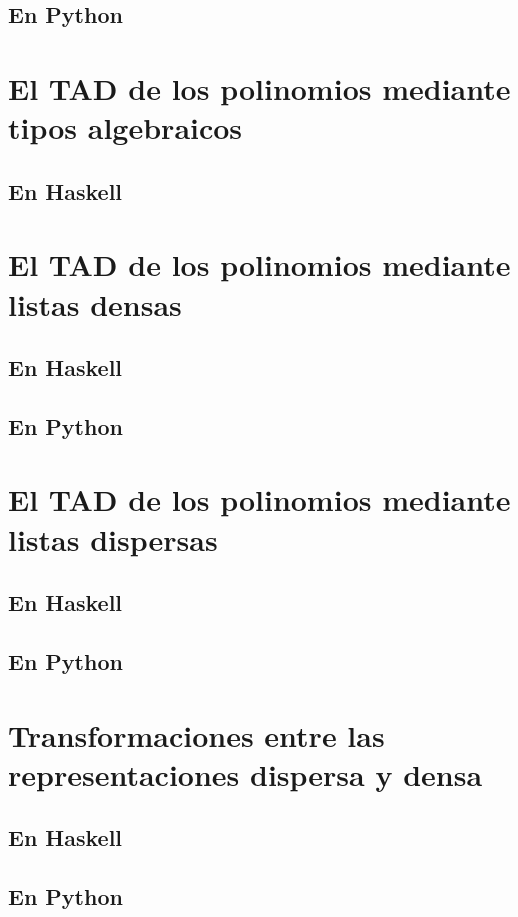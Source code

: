 \documentclass[a4paper,12pt,twoside]{book}
\begin{document}
\subsection{En Python}

\section{El TAD de los polinomios mediante tipos algebraicos}
\subsection{En Haskell}

\section{El TAD de los polinomios mediante listas densas}
\subsection{En Haskell}
\subsection{En Python}

\section{El TAD de los polinomios mediante listas dispersas}
\subsection{En Haskell}
\subsection{En Python}

\section{Transformaciones entre las representaciones dispersa y densa}
\subsection{En Haskell}
\subsection{En Python}
\end{document}
